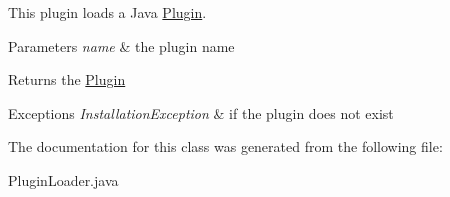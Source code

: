 This plugin loads a Java \mbox{\hyperlink{interfaceorg_1_1libelektra_1_1Plugin}{Plugin}}. 


\begin{DoxyParams}{Parameters}
{\em name} & the plugin name \\
\hline
\end{DoxyParams}
\begin{DoxyReturn}{Returns}
the \mbox{\hyperlink{interfaceorg_1_1libelektra_1_1Plugin}{Plugin}} 
\end{DoxyReturn}

\begin{DoxyExceptions}{Exceptions}
{\em Installation\+Exception} & if the plugin does not exist \\
\hline
\end{DoxyExceptions}


The documentation for this class was generated from the following file\+:\begin{DoxyCompactItemize}
\item 
Plugin\+Loader.\+java\end{DoxyCompactItemize}
